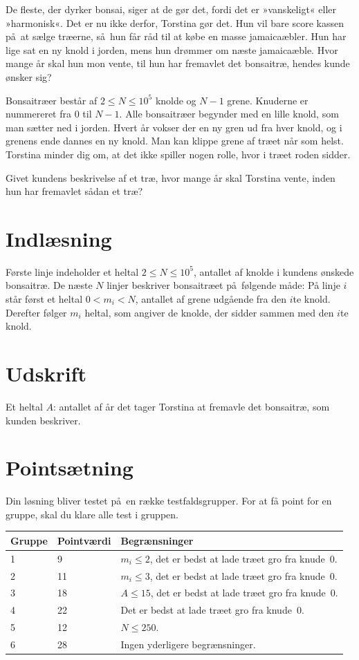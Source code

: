 
De fleste, der dyrker bonsai, siger at de gør det, fordi det er »vanskeligt« eller »harmonisk«.
Det er nu ikke derfor, Torstina gør det.
Hun vil bare score kassen på at sælge træerne, så hun får råd til at købe en masse jamaicaæbler.
Hun har lige sat en ny knold i jorden, mens hun drømmer om næste jamaicaæble.
Hvor mange år skal hun mon vente, til hun har fremavlet det bonsaitræ, hendes kunde ønsker sig?

Bonsaitræer består af $2\leq N \leq 10^5$ knolde og $N-1$ grene.
Knuderne er nummereret fra $0$ til $N-1$. 
Alle bonsaitræer begynder med en lille knold, som man sætter ned i jorden.
Hvert år vokser der en ny gren ud fra hver knold, og i grenens ende dannes en ny knold.
Man kan klippe grene af træet når som helst. 
Torstina minder dig om, at det ikke spiller nogen rolle, hvor i træet roden sidder.

Givet kundens beskrivelse af et træ, hvor mange år skal Torstina vente, inden hun har fremavlet sådan et træ?

\section*{Indlæsning}

Første linje indeholder et heltal $2\leq N\leq 10^5$, antallet af knolde i kundens ønskede bonsaitræ.
De næste $N$ linjer beskriver bonsaitræet på følgende måde:
På linje $i$ står først et heltal $0 < m_i < N$, antallet af grene udgående fra den $i$te knold. 
Derefter følger $m_i$ heltal, som angiver de knolde, der sidder sammen med den $i$te knold.

\section*{Udskrift}
Et heltal $A$: antallet af år det tager Torstina at fremavle det bonsaitræ, som kunden beskriver.

\section*{Pointsætning}

Din løsning bliver testet på en række testfaldsgrupper.
For at få point for en gruppe, skal du klare alle test i gruppen. 

\noindent
\begin{tabular}{| l | l | l |}
\hline
Gruppe & Pointværdi & Begrænsninger \\ \hline
1      &  9         & $m_i\leq 2$, det er bedst at lade træet gro fra knude~0.\\ \hline
2      & 11         & $m_i \leq 3$, det er bedst at lade træet gro fra knude~0. \\ \hline
3      & 18         & $A \leq 15$, det er bedst at lade træet gro fra knude~0. \\ \hline
4      & 22         & Det er bedst at lade træet gro fra knude~0. \\ \hline
5      & 12         & $N \leq 250$. \\ \hline
6      & 28         & Ingen yderligere begrænsninger. \\ \hline
\end{tabular}

